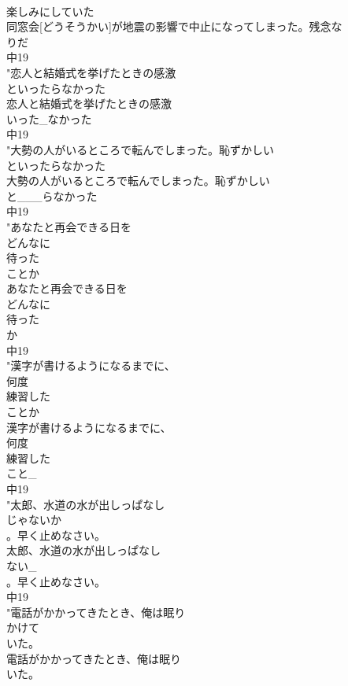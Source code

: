 \documentclass[8pt]{extreport}
\begin{document}
\begin{CJK}{UTF8}{min}
\\	楽しみにしていた
\\	同窓会[どうそうかい]が地震の影響で中止になってしまった。残念な
\\	りだ
\\	中19
\\	"恋人と結婚式を挙げたときの感激
\\	といったらなかった
\\	恋人と結婚式を挙げたときの感激
\\	いった_なかった
\\	中19
\\	"大勢の人がいるところで転んでしまった。恥ずかしい
\\	といったらなかった
\\	大勢の人がいるところで転んでしまった。恥ずかしい
\\	と___らなかった
\\	中19
\\	"あなたと再会できる日を
\\	どんなに
\\	待った
\\	ことか
\\	あなたと再会できる日を
\\	どんなに
\\	待った
\\	か
\\	中19
\\	"漢字が書けるようになるまでに、
\\	何度
\\	練習した
\\	ことか
\\	漢字が書けるようになるまでに、
\\	何度
\\	練習した
\\	こと_
\\	中19
\\	"太郎、水道の水が出しっぱなし
\\	じゃないか
\\	。早く止めなさい。
\\	太郎、水道の水が出しっぱなし
\\	ない_
\\	。早く止めなさい。
\\	中19
\\	"電話がかかってきたとき、俺は眠り
\\	かけて
\\	いた。
\\	電話がかかってきたとき、俺は眠り
\\	いた。

\end{CJK}
\end{document}
